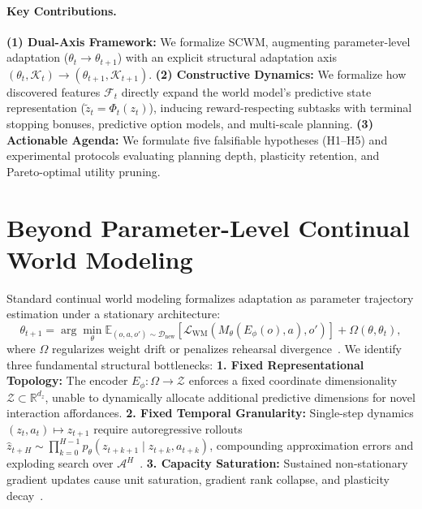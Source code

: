 \documentclass{article}
\theoremstyle{definition}
\begin{document}
\paragraph{Key Contributions.}
\textbf{(1) Dual-Axis Framework:} We formalize SCWM, augmenting parameter-level adaptation ($\theta_t \to \theta_{t+1}$) with an explicit structural adaptation axis $(\theta_t, \mathcal{K}_t) \to (\theta_{t+1}, \mathcal{K}_{t+1})$.
\textbf{(2) Constructive Dynamics:} We formalize how discovered features $\mathcal{F}_t$ directly expand the world model's predictive state representation ($\tilde{z}_t = \Phi_t(z_t)$), inducing reward-respecting subtasks with terminal stopping bonuses, predictive option models, and multi-scale planning.
\textbf{(3) Actionable Agenda:} We formulate five falsifiable hypotheses (H1--H5) and experimental protocols evaluating planning depth, plasticity retention, and Pareto-optimal utility pruning.

\section{Beyond Parameter-Level Continual World Modeling}
\label{sec:gap}
\enlargethispage{1.5\baselineskip}

Standard continual world modeling formalizes adaptation as parameter trajectory estimation under a stationary architecture:
\begin{equation}
\label{eq:param_update}
\theta_{t+1} = \arg\min_\theta \mathbb{E}_{(o, a, o') \sim \mathcal{D}_{\text{new}}} \left[ \mathcal{L}_{\text{WM}}(M_\theta(E_\phi(o), a), o') \right] + \Omega(\theta, \theta_t),
\end{equation}
where $\Omega$ regularizes weight drift or penalizes rehearsal divergence~\citep{kessler2023effectiveness, yang2024augmenting}. We identify three fundamental structural bottlenecks:
\textbf{1. Fixed Representational Topology:} The encoder $E_\phi: \Omega \to \mathcal{Z}$ enforces a fixed coordinate dimensionality $\mathcal{Z} \subset \mathbb{R}^{d_z}$, unable to dynamically allocate additional predictive dimensions for novel interaction affordances.
\textbf{2. Fixed Temporal Granularity:} Single-step dynamics $(z_t, a_t) \mapsto z_{t+1}$ require autoregressive rollouts $\hat{z}_{t+H} \sim \prod_{k=0}^{H-1} p_\theta(z_{t+k+1} \mid z_{t+k}, a_{t+k})$, compounding approximation errors and exploding search over $\mathcal{A}^H$~\citep{freed2023learning, jiralerspong2023forecaster}.
\textbf{3. Capacity Saturation:} Sustained non-stationary gradient updates cause unit saturation, gradient rank collapse, and plasticity decay~\citep{dohare2024loss}.
\end{document}

